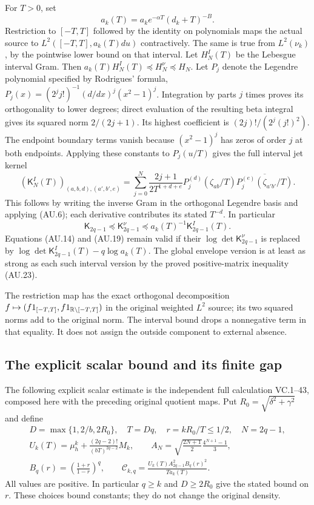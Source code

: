 For $T>0$, set
\[
 a_k(T)=a_ke^{-\alpha T}(d_k+T)^{-B}.
 \tag{AU.21}
\]
Restriction to $[-T,T]$ followed by the identity on polynomials maps
the actual source to $L^2([-T,T],a_k(T)du)$ contractively. The same
is true from $L^2(\nu_k)$, by the pointwise lower bound on that
interval. Let $H_N^I(T)$ be the Lebesgue interval Gram. Then
$a_k(T)H_N^I(T)\preceq H_N^\nu\preceq H_N$.
Let $P_j$ denote the Legendre polynomial specified by Rodrigues'
formula, $P_j(x)=(2^jj!)^{-1}(d/dx)^j(x^2-1)^j$.
Integration by parts $j$ times proves its orthogonality to lower
degrees; direct evaluation of the resulting beta integral gives its
squared norm $2/(2j+1)$. Its highest coefficient is
$(2j)!/(2^j(j!)^2)$. The endpoint boundary terms vanish because
$(x^2-1)^j$ has zeros of order $j$ at both endpoints.
Applying these constants to $P_j(u/T)$ gives the full interval jet
kernel
\[
 (\mathsf K_N^I(T))_{(a,b,d),(a',b',e)}
 =\sum_{j=0}^N\frac{2j+1}{2T^{1+d+e}}
 P_j^{(d)}(\zeta_{ab}/T)
 \overline{P_j^{(e)}(\zeta_{a'b'}/T)}.                    \tag{AU.22}
\]
This follows by writing the inverse Gram in the orthogonal Legendre
basis and applying (AU.6); each derivative contributes its stated
$T^{-d}$. In particular
\[
 \mathsf K_{2q-1}\preceq\mathsf K_{2q-1}^\nu
          \preceq a_k(T)^{-1}\mathsf K_{2q-1}^I(T).       \tag{AU.23}
\]
Equations (AU.14) and (AU.19) remain valid if their
$\log\det\mathsf K_{2q-1}^\nu$ is replaced by
$\log\det\mathsf K_{2q-1}^I(T)-q\log a_k(T)$.
The global envelope version is at least as strong as each such interval
version by the proved positive-matrix inequality (AU.23).

The restriction map has the exact orthogonal decomposition
$f\mapsto(f1_{[-T,T]},f1_{\mathbb R\setminus[-T,T]})$ in the original
weighted $L^2$ source; its two squared norms add to the original norm.
The interval bound drops a nonnegative term in that equality. It does
not assign the outside component to external absence.

\subsection{The explicit scalar bound and its finite gap}

The following explicit scalar estimate is the independent full calculation
VC.1--43, composed here with the preceding original quotient maps.
Put $R_0=\sqrt{\delta^2+\gamma^2}$ and define
\[
 \begin{gathered}
 D=\max\{1,2/b,2R_0\},\quad T=Dq,\quad r=kR_0/T\le1/2,\quad N=2q-1,\\
 U_k(T)=\mu_h^k+\frac{(2q-2)!}{(bT)^{2q-2}}M_k,\qquad
 A_N=\sqrt{\frac{2N+1}{2}}\frac{4^{N+1}-1}{3},\\
 B_q(r)=\left(\frac{1+r}{1-r}\right)^q,\qquad
 \mathcal C_{k,q}=
       \frac{U_k(T)A_{2q-1}^2B_q(r)^2}{T a_k(T)}.
 \end{gathered}                                             \tag{AU.24}
\]
All values are positive. In particular $q\ge k$ and $D\ge2R_0$
give the stated bound on $r$. These choices bound constants; they do
not change the original density.

